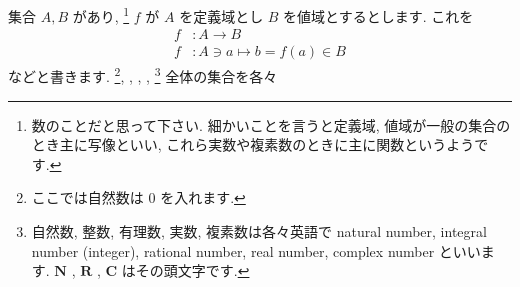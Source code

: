 \documentclass[openany, a4paper, oneside]{jsbook}
\begin{document}
集合 $A,B$ があり,  \footnote{数のことだと思って下さい.
細かいことを言うと定義域, 値域が一般の集合のとき主に写像といい,
これら実数や複素数のときに主に関数というようです.}
$f$ が $A$ を定義域とし $B$ を値域とするとします.
これを
\begin{align}
f &:  A \rightarrow B \\
f &: A\ni  a \mapsto     b=f (a)\in B
\end{align}
などと書きます.
 \footnote{ここでは自然数は $0$ を入れます.}, , ,
,  \footnote{自然数, 整数, 有理数, 実数, 複素数は各々英語で natural number, integral number (integer),
rational number, real number, complex number といいます.  $\bm{N}$ ,  $\bm{R}$ ,  $\bm{C}$ はその頭文字です.}
全体の集合を各々
\end{document}
